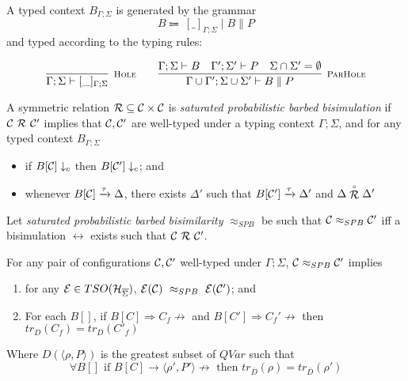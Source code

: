 A typed context $B_{\Gamma; \Sigma}$ is generated by the grammar
\[
B \Coloneqq \ [\_]_{\Gamma; \Sigma} \mid B \parallel P
\]
and typed according to the typing rules:

\[
 \infer[\mbox{\footnotesize\scshape Hole}]{\Gamma; \Sigma \vdash [\_]_{\Gamma; \Sigma}}{} 
 \qquad \infer[\mbox{\footnotesize\scshape ParHole}]{\Gamma \cup \Gamma'; \Sigma \cup \Sigma' \vdash B \parallel P}
{\Gamma; \Sigma \vdash B & \Gamma'; \Sigma' \vdash P & \Sigma \cap \Sigma' = \emptyset}
\]

\begin{definition}
	A symmetric relation $\mathcal{R} \subseteq \mathcal{C} \times \mathcal{C}$ is \emph{saturated probabilistic barbed bisimulation} if $\conf\ \rel\ \conf'$ implies that $\mathcal{C}, \mathcal{C}'$ are well-typed under a typing context $\Gamma; \Sigma$, and for any typed context $B_{\Gamma;\Sigma}$
	\begin{itemize}
		\item if $B[\mathcal{C}] \downarrow_{c}$ then $B[\mathcal{C}'] \downarrow_{c}$; and 
		\item whenever $B[\mathcal{C}] \xrightarrow{\tau} \Delta$, there exists $\Delta'$ such that $B[\mathcal{C}'] \xrightarrow{\tau} \Delta'$ and $\Delta \stackrel{\scriptscriptstyle \circ}{\mathcal{R}} \Delta'$
	\end{itemize}
	Let \emph{saturated probabilistic barbed bisimilarity} $\approx_{SPB}$ be such that $\mathcal{C} \approx_{SPB} \mathcal{C}'$ iff a bisimulation $\rel$ exists such that $\conf\ \rel\ \conf'$. 
\end{definition}

\begin{theorem}
	For any pair of configurations $\mathcal{C}, \mathcal{C}'$ well-typed under $\Gamma; \Sigma$, 
	$\mathcal{C} \approx_{SPB} \mathcal{C}'$ implies
	\begin{enumerate}
		\item for any $\mathcal{E} \in TSO(\mathcal{H}_{\overline{\Sigma}})$, $\mathcal{E} (\mathcal{C})\ \approx_{SPB}\ \mathcal{E} (\mathcal{C}')$; and
		\item For each $B[]$, if $B[C] \Rightarrow C_f\not\rightarrow $ and $B[C'] \Rightarrow C_f'\not\rightarrow$ then $tr_{D}(C_f) = tr_{D}(C'_f)$
	\end{enumerate}
	Where $D(\langle \rho, P\rangle)$ is the greatest subset of $QVar$ such that 
	\[ \forall B[] \text{ if } B[C] \rightarrow \langle\rho', P'\rangle \not\rightarrow \text{ then } tr_{\overline{D}}(\rho) = tr_{\overline{D}}(\rho')
	\] 
\end{theorem}





